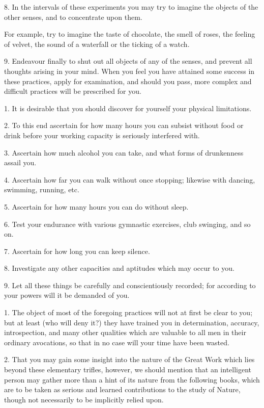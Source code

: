 8. In the intervals of these experiments you may try to imagine the objects of the other senses, and to concentrate upon them.

For example, try to imagine the taste of chocolate, the smell of roses, the feeling of velvet, the sound of a waterfall or the ticking of a watch.

9. Endeavour finally to shut out all objects of any of the senses, and prevent all thoughts arising in your mind. When you feel you have attained some success in these practices, apply for examination, and should you pass, more complex and difficult practices will be prescribed for you.


1. It is desirable that you should discover for yourself your physical limitations.

2. To this end ascertain for how many hours you can subsist without food or drink before your working capacity is seriously interfered with.

3. Ascertain how much alcohol you can take, and what forms of drunkenness assail you.

4. Ascertain how far you can walk without once stopping; likewise with dancing, swimming, running, etc.

5. Ascertain for how many hours you can do without sleep.

6. Test your endurance with various gymnastic exercises, club swinging, and so on.

7. Ascertain for how long you can keep silence.

8. Investigate any other capacities and aptitudes which may occur to you.

9. Let all these things be carefully and conscientiously recorded; for according to your powers will it be demanded of you.


1. The object of most of the foregoing practices will not at first be clear to you; but at least (who will deny it?) they have trained you in determination, accuracy, introspection, and many other qualities which are valuable to all men in their ordinary avocations, so that in no case will your time have been wasted.

2. That you may gain some insight into the nature of the Great Work which lies beyond these elementary trifles, however, we should mention that an intelligent person may gather more than a hint of its nature from the following books, which are to be taken as serious and learned contributions to the study of Nature, though not necessarily to be implicitly relied upon.

